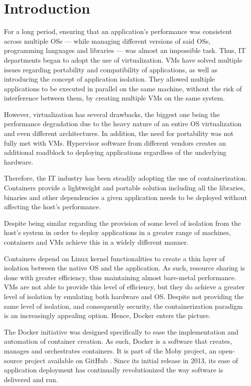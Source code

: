 \section{Introduction}
\label{sec::intro}

For a long period, ensuring that an application's performance was consistent across multiple \acsp{OS} --- while managing different versions of said \acsp{OS}, programming languages and libraries --- was almost an impossible task. Thus, IT departments began to adopt the use of virtualization. \acsp{VM} have solved multiple issues regarding portability and compatibility of applications, as well as introducing the concept of application isolation. They allowed multiple applications to be executed in parallel on the same machine, without the risk of interference between them, by creating multiple \acsp{VM} on the same system.

However, virtualization has several drawbacks, the biggest one being the performance degradation due to the heavy nature of an entire \acs{OS} virtualization and even different architectures. In addition, the need for portability was not fully met with \acsp{VM}. Hypervisor software from different vendors creates an additional roadblock to deploying applications regardless of the underlying hardware.

Therefore, the IT industry has been steadily adopting the use of containerization. Containers provide a lightweight and portable solution including all the libraries, binaries and other dependencies a given application needs to be deployed without affecting the host's performance.

Despite being similar regarding the provision of some level of isolation from the host's system in order to deploy applications in a greater range of machines, containers and \acsp{VM} achieve this in a widely different manner.

Containers depend on Linux kernel functionalities to create a thin layer of isolation between the native \acs{OS} and the application. As such, resource sharing is done with greater efficiency, thus maintaining almost bare-metal performance. \acsp{VM} are not able to provide this level of efficiency, but they do achieve a greater level of isolation by emulating both hardware and \acs{OS}. Despite not providing the same level of isolation, and consequently security, the containerization paradigm is an increasingly appealing option. Hence, Docker enters the picture.

The Docker initiative was designed specifically to ease the implementation and automation of container creation. As such, Docker is a software that creates, manages and orchestrates containers. It is part of the Moby project, an open-source project available on GitHub \cite{moby-git}. Since its initial release in 2013, its ease of application deployment has continually revolutionized the way software is delivered and run.

